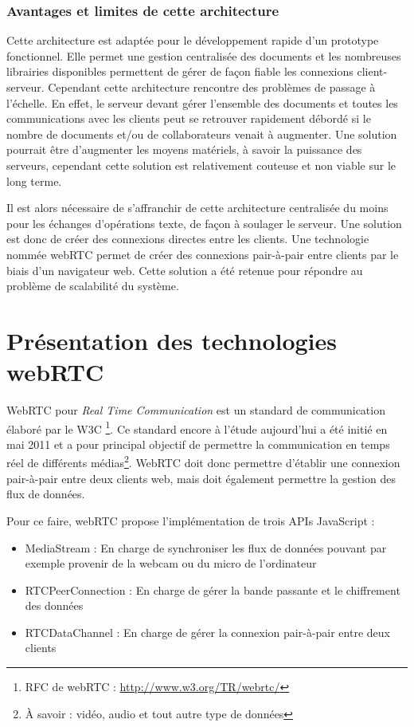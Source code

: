 \documentclass{tnreport}
\begin{document}
\subsubsection{Avantages et limites de cette architecture}

Cette architecture est adaptée pour le développement rapide d'un prototype fonctionnel. Elle permet une gestion centralisée des documents et les nombreuses librairies disponibles permettent de gérer de façon fiable les connexions client-serveur. Cependant cette architecture rencontre des problèmes de passage à l'échelle. En effet, le serveur devant gérer l'ensemble des documents et toutes les communications avec les clients peut se retrouver rapidement débordé si le nombre de documents et/ou de collaborateurs venait à augmenter. Une solution pourrait être d'augmenter les moyens matériels, à savoir la puissance des serveurs, cependant cette solution est relativement couteuse et non viable sur le long terme.

Il est alors nécessaire de s'affranchir de cette architecture centralisée du moins pour les échanges d'opérations texte, de façon à soulager le serveur. Une solution est donc de créer des connexions directes entre les clients. Une technologie nommée webRTC permet de créer des connexions pair-à-pair entre clients par le biais d'un navigateur web. Cette solution a été retenue pour répondre au problème de scalabilité du système.




\section{Présentation des technologies webRTC}
WebRTC pour \emph{Real Time Communication} est un standard de communication élaboré par le W3C \footnote{RFC de webRTC : \url{http://www.w3.org/TR/webrtc/}}. Ce standard encore à l'étude aujourd'hui a été initié en mai 2011 et a pour principal objectif de permettre la communication en temps réel de différents médias\footnote{À savoir : vidéo, audio et tout autre type de données}. WebRTC doit donc permettre d'établir une connexion pair-à-pair entre deux clients web, mais doit également permettre la gestion des flux de données. 

Pour ce faire, webRTC propose l'implémentation de trois APIs JavaScript :
\begin{itemize}
  \item MediaStream : En charge de synchroniser les flux de données pouvant par exemple provenir de la webcam ou du micro de l'ordinateur
  \item RTCPeerConnection : En charge de gérer la bande passante et le chiffrement des données
  \item RTCDataChannel : En charge de gérer la connexion pair-à-pair entre deux clients\\
\end{itemize}
\end{document}
